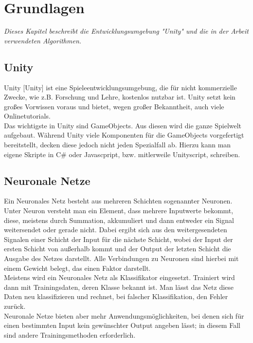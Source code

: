 \documentclass[
	12pt,
	a4paper,
	BCOR10mm,
	DIV14,
	headsepline,
	usegeometry,
]{scrreprt}
\begin{document}
\chapter{Grundlagen}
\label{basics}

\textit{%
Dieses Kapitel beschreibt die Entwicklungsumgebung "Unity" und die in der Arbeit verwendeten Algorithmen.}

\section{Unity}
Unity [Unity] ist eine Spieleentwicklungsumgebung, die für nicht kommerzielle Zwecke, wie z.B. Forschung und Lehre, kostenlos nutzbar ist. Unity setzt kein großes Vorwissen voraus und bietet, wegen großer Bekanntheit, auch viele Onlinetutorials.\\
Das wichtigste in Unity sind GameObjects. Aus diesen wird die ganze Spielwelt aufgebaut. Während Unity viele Komponenten für die GameObjects vorgefertigt bereitstellt, decken diese jedoch nicht jeden Spezialfall ab. Hierzu kann man eigene Skripte in C\# oder Javascpript, bzw. mitlerweile Unityscript, schreiben.


\section{Neuronale Netze}
Ein Neuronales Netz besteht aus mehreren Schichten sogenannter Neuronen. Unter Neuron versteht man ein Element, dass mehrere Inputwerte bekommt, diese, meistens durch Summation, akkumuliert und dann entweder ein Signal weitersendet oder gerade nicht. Dabei ergibt sich aus den weitergesendeten Signalen einer Schicht der Input für die nächste Schicht, wobei der Input der ersten Schicht von außerhalb kommt und der Output der letzten Schicht die Ausgabe des Netzes darstellt. Alle Verbindungen zu Neuronen sind hierbei mit einem Gewicht belegt, das einen Faktor darstellt.\\ Meistens wird ein Neuronales Netz als Klassifikator eingesetzt. Trainiert wird dann mit Trainingsdaten, deren Klasse bekannt ist. Man lässt das Netz diese Daten neu klassifizieren und rechnet, bei falscher Klassifikation, den Fehler zurück.\\
Neuronale Netze bieten aber mehr Anwendungsmöglichkeiten, bei denen sich für einen bestimmten Input kein gewünschter Output angeben lässt; in diesem Fall sind andere Trainingsmethoden erforderlich.

\pagebreak
\end{document}
